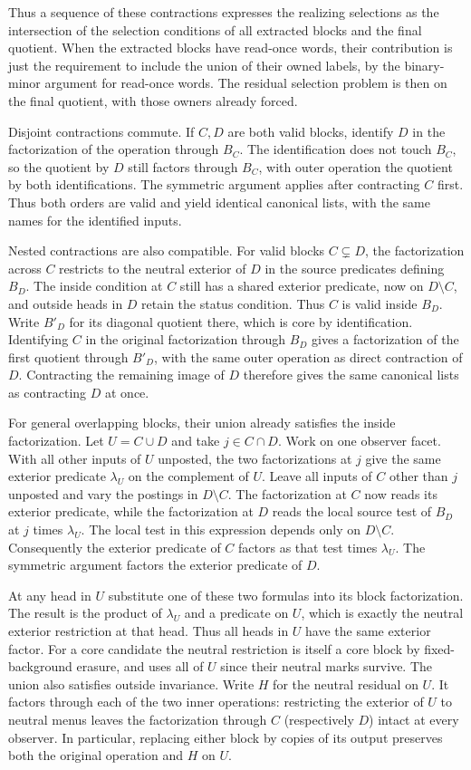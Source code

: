 Thus a sequence of these contractions expresses the
realizing selections as the intersection of the
selection conditions of all extracted blocks and
the final quotient. When the extracted blocks have
read-once words, their contribution is just the
requirement to include the union of their owned
labels, by the binary-minor argument for read-once
words. The residual selection problem is then on
the final quotient, with those owners already forced.

Disjoint contractions commute. If $C,D$ are both
valid blocks, identify $D$ in the factorization of
the operation through $B_C$. The identification does
not touch $B_C$, so the quotient by $D$ still factors
through $B_C$, with outer operation the quotient by
both identifications. The symmetric argument applies
after contracting $C$ first. Thus both orders are
valid and yield identical canonical lists, with the
same names for the identified inputs.

Nested contractions are also compatible. For valid
blocks $C\subsetneq D$, the factorization across
$C$ restricts to the neutral exterior of $D$ in
the source predicates defining $B_D$. The inside
condition at $C$ still has a shared exterior
predicate, now on $D\setminus C$, and outside
heads in $D$ retain the status condition. Thus $C$
is valid inside $B_D$. Write $B'_D$ for its diagonal
quotient there, which is core by identification.
Identifying $C$ in the original factorization
through $B_D$ gives a factorization of the first
quotient through $B'_D$, with the same outer
operation as direct contraction of $D$. Contracting
the remaining image of $D$ therefore gives the
same canonical lists as contracting $D$ at once.

For general overlapping blocks, their union already
satisfies the inside factorization. Let $U=C\cup D$
and take $j\in C\cap D$. Work on one observer facet.
With all other inputs of $U$ unposted, the two
factorizations at $j$ give the same exterior
predicate $\lambda_U$ on the complement of $U$.
Leave all inputs of $C$ other than $j$ unposted and
vary the postings in $D\setminus C$. The factorization
at $C$ now reads its exterior predicate, while the
factorization at $D$ reads the local source test of
$B_D$ at $j$ times $\lambda_U$. The local test in
this expression depends only on $D\setminus C$.
Consequently the exterior predicate of $C$ factors
as that test times $\lambda_U$. The symmetric
argument factors the exterior predicate of $D$.

At any head in $U$ substitute one of these two
formulas into its block factorization. The result
is the product of $\lambda_U$ and a predicate on
$U$, which is exactly the neutral exterior restriction
at that head. Thus all heads in $U$ have the same
exterior factor. For a core candidate the neutral
restriction is itself a core block by fixed-background
erasure, and uses all of $U$ since their neutral
marks survive. The union also satisfies outside invariance. Write
$H$ for the neutral residual on $U$. It factors
through each of the two inner operations: restricting
the exterior of $U$ to neutral menus leaves the
factorization through $C$ (respectively $D$) intact
at every observer. In particular, replacing either
block by copies of its output preserves both the
original operation and $H$ on $U$.


